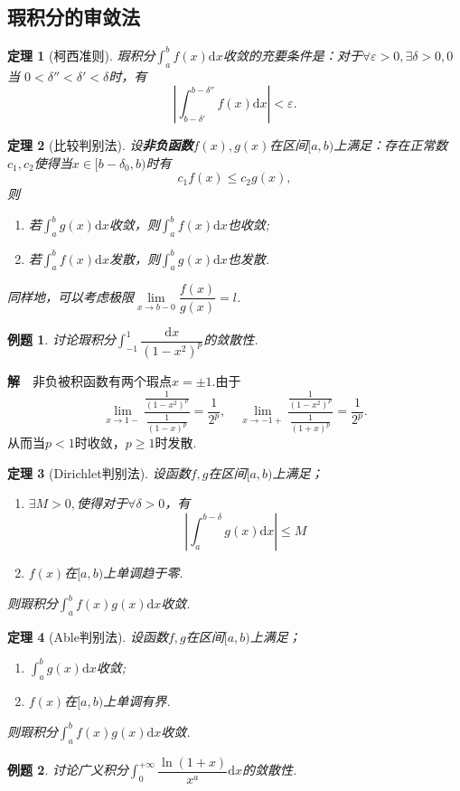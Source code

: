 \documentclass[UTF8]{article}
\newcommand{\dx}{\mathrm{d}x}
\newcommand{\jie}{\textbf{解}$\quad$}
\newtheorem{thm}{\hspace{2em}定理}[section]
\newtheorem{exa}{\hspace{2em}例题}[section]
\begin{document}
\subsection{瑕积分的审敛法}
\begin{thm}[柯西准则]
  瑕积分$\displaystyle\int_a^bf(x)\dx$收敛的充要条件是：对于$\forall\varepsilon>0,\exists\delta>0,0$当
  $0<\delta''<\delta'<\delta$时，有
  $$\left|\int_{b-\delta'}^{b-\delta''}f(x)\dx\right|<\varepsilon.$$
\end{thm}
\begin{thm}[比较判别法]
  设\textbf{非负函数}$f(x),g(x)$在区间$[a,b)$上满足：存在正常数$c_1,c_2$使得当$x\in[b-\delta_0,b)$时有
  $$c_1f(x)\le c_2g(x),$$则
  \begin{enumerate}
    \item 若$\int_a^bg(x)\dx$收敛，则$\int_a^bf(x)\dx$也收敛;
    \item 若$\int_a^bf(x)\dx$发散，则$\int_a^bg(x)\dx$也发散.
  \end{enumerate}
  同样地，可以考虑极限$\lim\limits_{x\to b-0}\dfrac{f(x)}{g(x)}=l$.
\end{thm}
\begin{exa}
  讨论瑕积分$\displaystyle\int_{-1}^1\dfrac{\dx}{(1-x^2)^p}$的敛散性.
\end{exa}
\jie 非负被积函数有两个瑕点$x=\pm1$.由于
$$\lim_{x\to1-}\frac{\frac{1}{(1-x^2)^p}}{\frac{1}{(1-x)^p}}=\frac{1}{2^p},\quad
\lim_{x\to-1+}\frac{\frac{1}{(1-x^2)^p}}{\frac{1}{(1+x)^p}}=\frac{1}{2^p}.$$
从而当$p<1$时收敛，$p\ge1$时发散.
\begin{thm}[Dirichlet判别法]
  设函数$f,g$在区间$[a,b)$上满足；
  \begin{enumerate}
    \item $\exists M>0,$使得对于$\forall\delta>0$，有
    $$\left|\int_a^{b-\delta}g(x)\dx\right|\le M$$
    \item $f(x)$在$[a,b)$上单调趋于零.
  \end{enumerate}
  则瑕积分$\int_a^bf(x)g(x)\dx$收敛.
\end{thm}
\begin{thm}[Able判别法]
  设函数$f,g$在区间$[a,b)$上满足；
  \begin{enumerate}
    \item $\displaystyle\int_a^bg(x)\dx$收敛;
    \item $f(x)$在$[a,b)$上单调有界.
  \end{enumerate}
    则瑕积分$\int_a^bf(x)g(x)\dx$收敛.
\end{thm}
\begin{exa}
  讨论广义积分$\displaystyle\int_0^{+\infty}\dfrac{\ln(1+x)}{x^a}\dx$的敛散性.
\end{exa}
\end{document}
